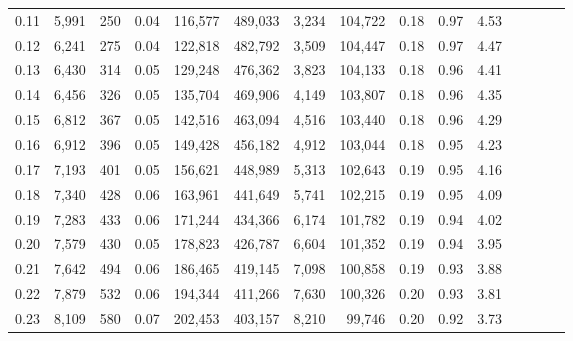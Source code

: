 \begin{tabular}{rrrcrrrrrrrrrrr}
0.11 &   5,991 &     250 &                                       0.04 &  116,577 &  489,033 &    3,234 &  104,722 &  0.18 &  0.97 &                         4.53 \\
0.12 &   6,241 &     275 &                                       0.04 &  122,818 &  482,792 &    3,509 &  104,447 &  0.18 &  0.97 &                         4.47 \\
0.13 &   6,430 &     314 &                                       0.05 &  129,248 &  476,362 &    3,823 &  104,133 &  0.18 &  0.96 &                         4.41 \\
0.14 &   6,456 &     326 &                                       0.05 &  135,704 &  469,906 &    4,149 &  103,807 &  0.18 &  0.96 &                         4.35 \\
0.15 &   6,812 &     367 &                                       0.05 &  142,516 &  463,094 &    4,516 &  103,440 &  0.18 &  0.96 &                         4.29 \\
0.16 &   6,912 &     396 &                                       0.05 &  149,428 &  456,182 &    4,912 &  103,044 &  0.18 &  0.95 &                         4.23 \\
0.17 &   7,193 &     401 &                                       0.05 &  156,621 &  448,989 &    5,313 &  102,643 &  0.19 &  0.95 &                         4.16 \\
0.18 &   7,340 &     428 &                                       0.06 &  163,961 &  441,649 &    5,741 &  102,215 &  0.19 &  0.95 &                         4.09 \\
0.19 &   7,283 &     433 &                                       0.06 &  171,244 &  434,366 &    6,174 &  101,782 &  0.19 &  0.94 &                         4.02 \\
0.20 &   7,579 &     430 &                                       0.05 &  178,823 &  426,787 &    6,604 &  101,352 &  0.19 &  0.94 &                         3.95 \\
0.21 &   7,642 &     494 &                                       0.06 &  186,465 &  419,145 &    7,098 &  100,858 &  0.19 &  0.93 &                         3.88 \\
0.22 &   7,879 &     532 &                                       0.06 &  194,344 &  411,266 &    7,630 &  100,326 &  0.20 &  0.93 &                         3.81 \\
0.23 &   8,109 &     580 &                                       0.07 &  202,453 &  403,157 &    8,210 &   99,746 &  0.20 &  0.92 &                         3.73 \\

\end{tabular}
